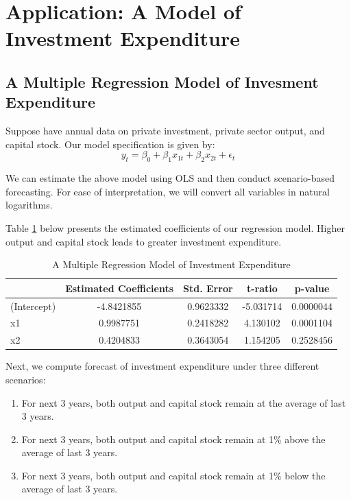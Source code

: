 \documentclass[]{book}
\theoremstyle{definition}
\theoremstyle{definition}
\theoremstyle{definition}
\theoremstyle{remark}
\begin{document}
\hypertarget{application-a-model-of-investment-expenditure}{%
\section{Application: A Model of Investment Expenditure}\label{application-a-model-of-investment-expenditure}}

\hypertarget{a-multiple-regression-model-of-invesment-expenditure}{%
\subsection{A Multiple Regression Model of Invesment Expenditure}\label{a-multiple-regression-model-of-invesment-expenditure}}

Suppose have annual data on private investment, private sector output, and capital stock. Our model specification is given by:
\begin{equation}
y_t= \beta_0 + \beta_1 x_{1t}+ \beta_2 x_{2t}+\epsilon_t
\end{equation}

We can estimate the above model using OLS and then conduct scenario-based forecasting. For ease of interpretation, we will convert all variables in natural logarithms.

Table \ref{tab:ch2-table1} below presents the estimated coefficients of our regression model. Higher output and capital stock leads to greater investment expenditure.

\begin{table}[t]

\caption{\label{tab:ch2-table1}A Multiple Regression Model of Investment Expenditure}
\centering
\begin{tabular}{lcccc}
\toprule
  & Estimated Coefficients & Std. Error & t-ratio & p-value\\
\midrule
(Intercept) & -4.8421855 & 0.9623332 & -5.031714 & 0.0000044\\
x1 & 0.9987751 & 0.2418282 & 4.130102 & 0.0001104\\
x2 & 0.4204833 & 0.3643054 & 1.154205 & 0.2528456\\
\bottomrule
\end{tabular}
\end{table}

Next, we compute forecast of investment expenditure under three different scenarios:

\begin{enumerate}
\def\labelenumi{\arabic{enumi}.}
\item
  For next 3 years, both output and capital stock remain at the average of last 3 years.
\item
  For next 3 years, both output and capital stock remain at 1\% above the average of last 3 years.
\item
  For next 3 years, both output and capital stock remain at 1\% below the average of last 3 years.
\end{enumerate}
\end{document}
